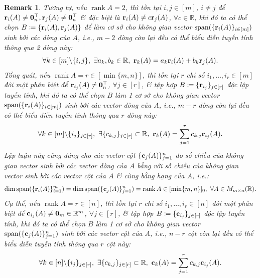 \documentclass{article}
\newtheorem{remark}{Remark}
\begin{document}
\begin{remark}
	Tương tự, nếu $\operatorname{rank}A = 2$, thì tồn tại $i,j\in[m]$, $i\ne j$ để ${\bf r}_i(A)\ne{\bf0}_n^\top,{\bf r}_j(A)\ne{\bf0}_n^\top$ \& đặc biệt là ${\bf r}_i(A)\ne c{\bf r}_j(A)$, $\forall c\in\mathbb{R}$, khi đó ta có thể chọn $B\coloneqq\{{\bf r}_i(A),{\bf r}_j(A)\}$ để làm cơ sở cho không gian vector ${\rm span}(\{{\bf r}_i(A)\}_{i\in[m]})$ sinh bởi các dòng của $A$, i.e., $m - 2$ dòng còn lại đều có thể biểu diễn tuyến tính thông qua 2 dòng này:
	\begin{equation*}
		\forall k\in[m]\backslash\{i,j\},\ \exists a_k,b_k\in\mathbb{R},\ {\bf r}_k(A) = a_k{\bf r}_i(A) + b_k{\bf r}_j(A).
	\end{equation*}
	Tổng quát, nếu $\operatorname{rank}A = r\in[\min\{m,n\}]$, thì tồn tại $r$ chỉ số $i_1,\ldots,i_r\in[m]$ đôi một phân biệt để ${\bf r}_{i_j}(A)\ne{\bf0}_n^\top$, $\forall j\in[r]$, \& tập hợp $B\coloneqq\{{\bf r}_{i_j}\}_{j\in[r]}$ độc lập tuyến tính, khi đó ta có thể chọn $B$ làm 1 cơ sở cho không gian vector ${\rm span}(\{{\bf r}_i(A)\}_{i\in[m]})$ sinh bởi các vector dòng của $A$, i.e., $m - r$ dòng còn lại đều có thể biểu diễn tuyến tính thông qua $r$ dòng này:
	\begin{equation*}
		\forall k\in[m]\backslash\{i_j\}_{j\in[r]},\ \exists\{c_{k,j}\}_{j\in[r]}\subset\mathbb{R},\ {\bf r}_k(A) = \sum_{j=1}^r c_{k,j}{\bf r}_{i_j}(A).
	\end{equation*}
	Lập luận này cũng đúng cho các vector cột $\{{\bf c}_j(A)\}_{j=1}^n$ do số chiều của không gian vector sinh bởi các vector dòng của $A$ bằng với số chiều của không gian vector sinh bởi các vector cột của $A$ \& cùng bằng hạng của $A$, i.e.:
	\begin{equation*}
		\dim{\rm span}(\{{\bf r}_i(A)\}_{i=1}^m) = \dim{\rm span}(\{{\bf c}_j(A)\}_{j=1}^n) = \operatorname{rank}A\in[\min\{m,n\}]_0,\ \forall A\in M_{m\times n}(\mathbb{R}).
	\end{equation*}
	Cụ thể, nếu $\operatorname{rank}A = r\in[n]$, thì tồn tại $r$ chỉ số $i_1,\ldots,i_r\in[n]$ đôi một phân biệt để ${\bf c}_{i_j}(A)\ne{\bf0}_m\in\mathbb{R}^m$, $\forall j\in[r]$, \& tập hợp $B\coloneqq\{{\bf c}_{i_j}\}_{j\in[r]}$ độc lập tuyến tính, khi đó ta có thể chọn $B$ làm 1 cơ sở cho không gian vector ${\rm span}(\{{\bf c}_j(A)\}_{j=1}^n)$ sinh bởi các vector cột của $A$, i.e., $n - r$ cột còn lại đều có thể biểu diễn tuyến tính thông qua $r$ cột này:
	\begin{equation*}
		\forall k\in[n]\backslash\{i_j\}_{j\in[r]},\ \exists\{c_{k,j}\}_{j\in[r]}\subset\mathbb{R},\ {\bf c}_k(A) = \sum_{j=1}^r c_{k,j}{\bf c}_{i_j}(A).
	\end{equation*}
\end{remark}
\end{document}
